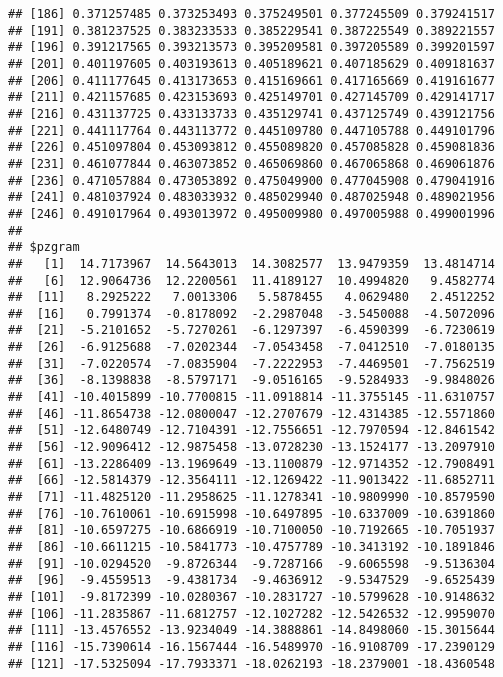 \documentclass[]{article}
\begin{document}
\begin{verbatim}
## [186] 0.371257485 0.373253493 0.375249501 0.377245509 0.379241517
## [191] 0.381237525 0.383233533 0.385229541 0.387225549 0.389221557
## [196] 0.391217565 0.393213573 0.395209581 0.397205589 0.399201597
## [201] 0.401197605 0.403193613 0.405189621 0.407185629 0.409181637
## [206] 0.411177645 0.413173653 0.415169661 0.417165669 0.419161677
## [211] 0.421157685 0.423153693 0.425149701 0.427145709 0.429141717
## [216] 0.431137725 0.433133733 0.435129741 0.437125749 0.439121756
## [221] 0.441117764 0.443113772 0.445109780 0.447105788 0.449101796
## [226] 0.451097804 0.453093812 0.455089820 0.457085828 0.459081836
## [231] 0.461077844 0.463073852 0.465069860 0.467065868 0.469061876
## [236] 0.471057884 0.473053892 0.475049900 0.477045908 0.479041916
## [241] 0.481037924 0.483033932 0.485029940 0.487025948 0.489021956
## [246] 0.491017964 0.493013972 0.495009980 0.497005988 0.499001996
## 
## $pzgram
##   [1]  14.7173967  14.5643013  14.3082577  13.9479359  13.4814714
##   [6]  12.9064736  12.2200561  11.4189127  10.4994820   9.4582774
##  [11]   8.2925222   7.0013306   5.5878455   4.0629480   2.4512252
##  [16]   0.7991374  -0.8178092  -2.2987048  -3.5450088  -4.5072096
##  [21]  -5.2101652  -5.7270261  -6.1297397  -6.4590399  -6.7230619
##  [26]  -6.9125688  -7.0202344  -7.0543458  -7.0412510  -7.0180135
##  [31]  -7.0220574  -7.0835904  -7.2222953  -7.4469501  -7.7562519
##  [36]  -8.1398838  -8.5797171  -9.0516165  -9.5284933  -9.9848026
##  [41] -10.4015899 -10.7700815 -11.0918814 -11.3755145 -11.6310757
##  [46] -11.8654738 -12.0800047 -12.2707679 -12.4314385 -12.5571860
##  [51] -12.6480749 -12.7104391 -12.7556651 -12.7970594 -12.8461542
##  [56] -12.9096412 -12.9875458 -13.0728230 -13.1524177 -13.2097910
##  [61] -13.2286409 -13.1969649 -13.1100879 -12.9714352 -12.7908491
##  [66] -12.5814379 -12.3564111 -12.1269422 -11.9013422 -11.6852711
##  [71] -11.4825120 -11.2958625 -11.1278341 -10.9809990 -10.8579590
##  [76] -10.7610061 -10.6915998 -10.6497895 -10.6337009 -10.6391860
##  [81] -10.6597275 -10.6866919 -10.7100050 -10.7192665 -10.7051937
##  [86] -10.6611215 -10.5841773 -10.4757789 -10.3413192 -10.1891846
##  [91] -10.0294520  -9.8726344  -9.7287166  -9.6065598  -9.5136304
##  [96]  -9.4559513  -9.4381734  -9.4636912  -9.5347529  -9.6525439
## [101]  -9.8172399 -10.0280367 -10.2831727 -10.5799628 -10.9148632
## [106] -11.2835867 -11.6812757 -12.1027282 -12.5426532 -12.9959070
## [111] -13.4576552 -13.9234049 -14.3888861 -14.8498060 -15.3015644
## [116] -15.7390614 -16.1567444 -16.5489970 -16.9108709 -17.2390129
## [121] -17.5325094 -17.7933371 -18.0262193 -18.2379001 -18.4360548

\end{verbatim}
\end{document}
